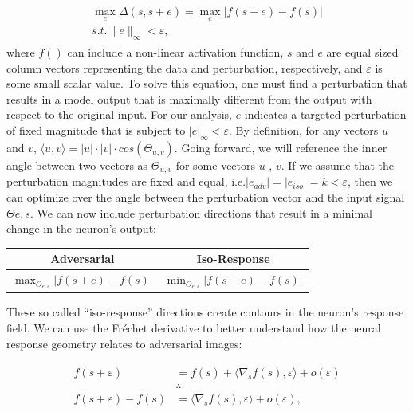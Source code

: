 \begin{align}\label{eq:adv_metric}
\begin{split}
    \max_{e} \Delta (s, s+e) = \max_{e} |f(s+e) - f(s)| \\
    s.t. \|e\|_{\infty} < \varepsilon,
\end{split}
\end{align}
where $f()$ can include a non-linear activation function, $s$ and $e$ are equal sized column vectors representing the data and perturbation, respectively, and $\varepsilon$ is some small scalar value. To solve this equation, one must find a perturbation that results in a model output that is maximally different from the output with respect to the original input. For our analysis, $e$ indicates a targeted perturbation of fixed magnitude that is subject to $|e|_{\infty}<\varepsilon$. By definition, for any vectors $u$ and $v$, $\langle u,v\rangle = |u| \cdot |v| \cdot cos(\Theta_{u,v})$. Going forward, we will reference the inner angle between two vectors as $\Theta_{u,v}$ for some vectors $u$ , $v$. If we assume that the perturbation magnitudes are fixed and equal, i.e.$|e_{adv}| = |e_{iso}| = k < \varepsilon$, then we can optimize over the angle between the perturbation vector and the input signal $\Theta{e,s}$. We can now include perturbation directions that result in a minimal change in the neuron's output:

\begin{center}
    \begin{tabular}{ |c | c| } \hline
     \textbf{Adversarial} & \textbf{Iso-Response} \\ \hline
     $\max_{\Theta_{e,s}}|f(s+e) - f(s)|$ & $\min_{\Theta_{e,s}} | f(s+e) - f(s) |$ \\ \hline
    \end{tabular}
\end{center}

These so called ``iso-response'' directions create contours in the neuron's response field. We can use the Fr\'{e}chet derivative \cite{citation} to better understand how the neural response geometry relates to adversarial images:

\begin{align}\label{eq:frechet}
\begin{split}
    f(s+\varepsilon) &= f(s) + \langle\nabla_{s}f(s), \varepsilon\rangle + o(\varepsilon)\\
    &\therefore \\
    f(s+\varepsilon) - f(s) &= \langle\nabla_{s}f(s), \varepsilon\rangle+ o(\varepsilon),
\end{split}
\end{align}

